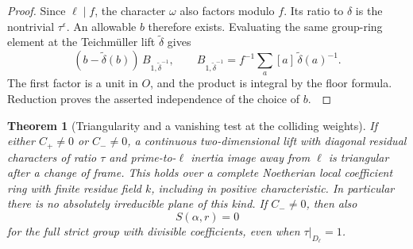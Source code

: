 \documentclass[a4paper,11pt]{article}
\newtheorem{theorem}[proposition]{Theorem}
\theoremstyle{definition}
\theoremstyle{remark}
\numberwithin{equation}{section}
\begin{document}
\begin{proof}
Since \(\ell\mid f\), the character \(\omega\) also factors
modulo \(f\). Its ratio to \(\delta\) is the nontrivial
\(\tau^\epsilon\). An allowable \(b\) therefore exists.
Evaluating the same group-ring element at the Teichm\"uller
lift \(\widetilde\delta\) gives
\[
 (b-\widetilde\delta(b))\,B_{1,\widetilde\delta^{-1}},\qquad
 B_{1,\widetilde\delta^{-1}}
     =f^{-1}\sum_a [a]\,\widetilde\delta(a)^{-1}.
\]
The first factor is a unit in \(O\), and the product is integral
by the floor formula. Reduction proves the asserted independence
of the choice of \(b\).~\cite{XII-IX-V-stick}
\end{proof}

\begin{theorem}[Triangularity and a vanishing test at the colliding weights]
\leavevmode\label{thm:planeunits565}
If either \(C_+\ne0\) or \(C_-\ne0\), a continuous two-dimensional
lift with diagonal residual characters of ratio \(\tau\) and
prime-to-\(\ell\) inertia image away from \(\ell\) is triangular
after a change of frame. This holds over a complete Noetherian
local coefficient ring with finite residue field \(k\), including
in positive characteristic. In particular there is no absolutely
irreducible plane of this kind. If \(C_-\ne0\), then also
\[
                         S(\alpha,r)=0
\]
for the full strict group with divisible coefficients, even when
\(\tau|_{D_\ell}=1\).
\end{theorem}
\end{document}
